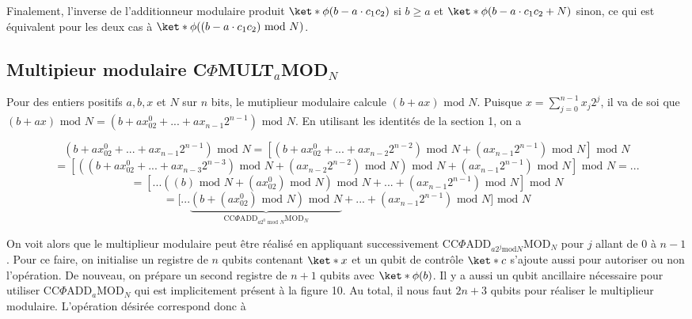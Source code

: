Finalement, l'inverse de l'additionneur modulaire produit $\ket*{\phi(b - a \cdot c_1c_2)}$ si $b \geq a$ et $\ket*{\phi(b - a \cdot c_1c_2 + N)}$ sinon, ce qui est équivalent pour les deux cas à $\ket*{\phi((b- a \cdot c_1c_2) \text{ mod } N)}$. 

\subsection{Multipieur modulaire C$\Phi$MULT$_a$MOD$_N$}
Pour des entiers positifs  $a, b, x$ et  $N$ sur $n$ bits, le mutiplieur modulaire calcule $(b + ax) \text{ mod } N$. Puisque $x = \sum_{j=0}^{n-1}x_j 2^j$, il va de soi que $(b + ax) \text{ mod } N = (b + ax_02^0 + ... + ax_{n-1}2^{n-1}) \text{ mod } N$. En utilisant les identités de la section 1, on a 

\begin{equation*}
    (b + ax_02^0 + ... + ax_{n-1}2^{n-1}) \text{ mod } N = [(b + ax_02^0 + ... + ax_{n-2}2^{n-2})\text{ mod } N + (ax_{n-1}2^{n-1}) \text{ mod } N] \text{ mod } N 
\end{equation*}
\begin{equation*}
    = [((b + ax_02^0 + ... + ax_{n-3}2^{n-3}) \text{ mod } N + (ax_{n-2}2^{n-2}) \text{ mod } N) \text{ mod } N + (ax_{n-1}2^{n-1})\text{ mod }N]\text{ mod }N = ...
\end{equation*}
\begin{equation*}
    = [... ((b) \text{ mod } N + (ax_02^0)\text{ mod } N)\text{ mod } N + ... + (ax_{n-1}2^{n-1})\text{ mod } N]\text{ mod } N
\end{equation*}
\begin{equation*}
    = [... {\underbrace{(b + (ax_02^0)\text{ mod } N)\text{ mod } N}_\text{CC$\Phi$ADD$_{a2^0 \text{ mod } N}$MOD$_N$} + ... + (ax_{n-1}2^{n-1})\text{ mod } N]\text{ mod } N}
\end{equation*}

On voit alors que le multiplieur modulaire peut être réalisé en appliquant successivement CC$\Phi$ADD$_{a2^j \text{mod} N}$MOD$_N$ pour $j$ allant de 0 à $n-1$. Pour ce faire, on initialise un registre de $n$ qubits contenant $\ket*{x}$ et un qubit de contrôle $\ket*{c}$ s'ajoute aussi pour autoriser ou non l'opération. De nouveau, on prépare un second registre de $n+1$ qubits avec $\ket*{\phi(b)}$. Il y a aussi un qubit ancillaire nécessaire pour utiliser CC$\Phi$ADD$_a$MOD$_N$ qui est implicitement présent à la figure 10. Au total, il nous faut $2n+3$ qubits pour réaliser le multiplieur modulaire. L'opération désirée correspond donc à 

